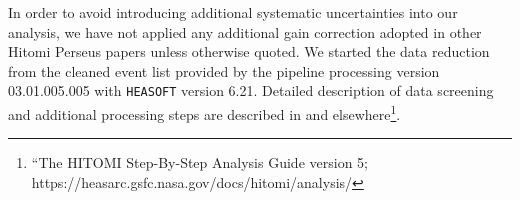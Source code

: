 In order to avoid introducing additional systematic uncertainties into our analysis, we have not applied any additional gain correction adopted in other Hitomi Perseus papers \citep[see e.g.][hereafter Atomic~paper]{atomicpaper} unless otherwise quoted. We started the data reduction from the cleaned event list provided by the pipeline processing version 03.01.005.005 \citep{angelini16} with \verb+HEASOFT+ version 6.21. Detailed description of data screening and additional processing steps are described in \citet[][hereafter T~paper]{tpaper} and elsewhere\footnote{ ``The HITOMI Step-By-Step Analysis Guide version 5; https://heasarc.gsfc.nasa.gov/docs/hitomi/analysis/}.
